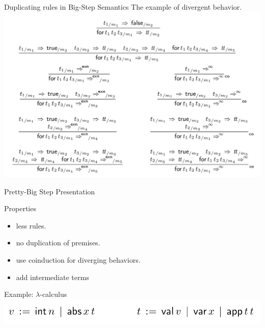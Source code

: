 \documentclass[page number,dvipsnames]{beamer}
\begin{document}
\begin{frame}{Duplicating rules in Big-Step Semantics}
  The example of divergent behavior.\\
  \center
  \includegraphics[scale=0.25]{duplicates.png}
  
\end{frame}

\begin{frame}{Pretty-Big Step Presentation}
  \begin{exampleblock}{Properties}
    \begin{itemize}
    \item less rules.
    \item no duplication of premises.
    \item use coinduction for diverging behaviors.
    \item add intermediate terms
    \end{itemize}
  \end{exampleblock}
  \vfill
  \begin{block}{Example: $\lambda$-calculus}
    \center
    \includegraphics[scale=0.3]{lambda.png}
  \end{block}
\end{frame}
\end{document}
